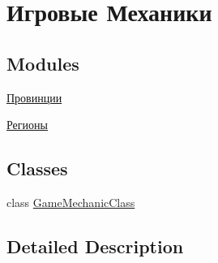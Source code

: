 \hypertarget{group___game_mechanics}{}\section{Игровые Механики}
\label{group___game_mechanics}
\subsection*{Modules}
\begin{DoxyCompactItemize}
\item 
\hyperlink{group___provs}{Провинции}
\item 
\hyperlink{group___provs_regions}{Регионы}
\end{DoxyCompactItemize}
\subsection*{Classes}
\begin{DoxyCompactItemize}
\item 
class \hyperlink{class_game_mechanic_class}{Game\+Mechanic\+Class}
\end{DoxyCompactItemize}


\subsection{Detailed Description}

